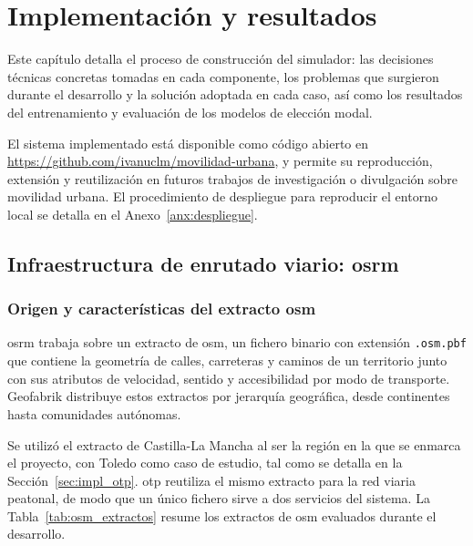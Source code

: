 \chapter{Implementación y resultados}
\label{ch:implementacion}

Este capítulo detalla el proceso de construcción del simulador: las decisiones técnicas concretas tomadas en cada componente, los problemas que surgieron durante el desarrollo y la solución adoptada en cada caso, así como los resultados del entrenamiento y evaluación de los modelos de elección modal.\newline

El sistema implementado está disponible como código abierto en \url{https://github.com/ivanuclm/movilidad-urbana}, y permite su reproducción, extensión y reutilización en futuros trabajos de investigación o divulgación sobre movilidad urbana. El procedimiento de despliegue para reproducir el entorno local se detalla en el Anexo~\ref{anx:despliegue}.
\section[Infraestructura de enrutado viario: OSRM]{Infraestructura de enrutado viario: \gls{osrm}}
\label{sec:impl_osrm}

\subsection[Origen y características del extracto OSM]{Origen y características del extracto \gls{osm}}
\label{subsec:impl_osrm_origen}

\gls{osrm} trabaja sobre un extracto de \acrlong{osm}, un fichero binario con extensión \texttt{.osm.pbf} que contiene la geometría de calles, carreteras y caminos de un territorio junto con sus atributos de velocidad, sentido y accesibilidad por modo de transporte. Geofabrik \cite{GeofabrikDownloads} distribuye estos extractos por jerarquía geográfica, desde continentes hasta comunidades autónomas.\newline

Se utilizó el extracto de Castilla-La Mancha al ser la región en la que se enmarca el proyecto, con Toledo como caso de estudio, tal como se detalla en la Sección~\ref{sec:impl_otp}. \gls{otp} reutiliza el mismo extracto para la red viaria peatonal, de modo que un único fichero sirve a dos servicios del sistema. La Tabla~\ref{tab:osm_extractos} resume los extractos de \gls{osm} evaluados durante el desarrollo.

